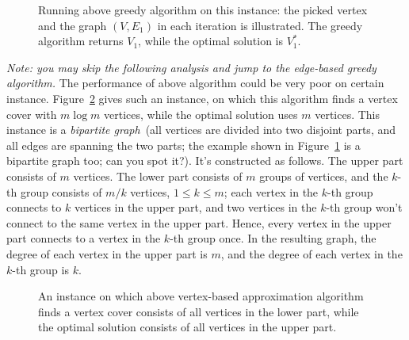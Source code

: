 
\begin{figure}[h]
\centering{}
\caption{Running above greedy algorithm on this instance:
	the picked vertex and the graph $(V, E_1)$
	in each iteration is illustrated. 
The greedy algorithm returns $V_1$, while the optimal solution is $V_1^*$.}
\label{fig:greedy1}
\end{figure}

\emph{Note: you may skip the following analysis and jump to the edge-based greedy algorithm.}
The performance of above algorithm could be very poor on certain instance.
Figure~\ref{fig:logn} gives such an instance, on which this algorithm
finds a vertex cover with $m\log m$ vertices, while the optimal solution
uses $m$ vertices. This instance is a \emph{bipartite graph}~(all vertices
are divided into two disjoint parts, and all edges are spanning the two parts;
the example shown in Figure~\ref{fig:greedy1} is a bipartite graph too; can you spot it?).
It's constructed as follows. The upper part consists of $m$ vertices.
The lower part consists of $m$ groups of vertices, and the $k$-th group
consists of $m/k$ vertices, $1\le k \le m$; 
each vertex in the $k$-th group connects to $k$ vertices
in the upper part, and two vertices in the $k$-th group
won't connect to the same vertex in the upper part.
Hence, every vertex in the upper part connects to a vertex in the $k$-th group once.
In the resulting graph, the degree of each vertex in the upper part is $m$,
and the degree of each vertex in the $k$-th group is $k$.

\begin{figure}[h]
\centering{}
\caption{An instance on which above vertex-based approximation 
algorithm finds a vertex cover consists of all vertices in the
lower part, while the optimal solution consists of all vertices
in the upper part.}
\label{fig:logn}
\end{figure}

